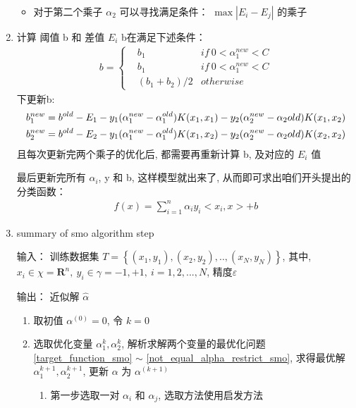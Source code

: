 \documentclass[oneside, 12pt]{ctexbook}
\begin{document}
\begin{enumerate}
\begin{itemize}
							\item 对于第二个乘子 $\alpha_2$ 可以寻找满足条件： $\max|E_i - E_j|$ 的乘子
						\end{itemize}
					
					\item 计算 阈值 b 和 差值 $E_i$
						b在满足下述条件：
							\begin{align}
								b = \left\{
									\begin{matrix}
										&b_1 &if \ 0<\alpha_1^{new}<C\\
										&b_1 &if \ 0<\alpha_1^{new}<C\\
										&(b_1 + b_2)/2 &otherwise
									\end{matrix}
								\right.
							\end{align} 
						下更新b:
							\begin{align}
							\centering
								&b_1^{new} = b^{old} - E_1 - y_1(\alpha_1^{new} - \alpha_1^{old}) K(x_1, x_1) - y_2(\alpha_2^{new} - \alpha_2{old}) K(x_1, x_2) \\
								&b_2^{new} = b^{old} - E_2 - y_1(\alpha_1^{new} - \alpha_1^{old}) K(x_1, x_2) - y_2(\alpha_2^{new} - \alpha_2{old}) K(x_2, x_2)
							\end{align}	
						且每次更新完两个乘子的优化后, 都需要再重新计算 b, 及对应的 $E_i$ 值
						
						最后更新完所有 $\alpha_i$, y 和 b, 这样模型就出来了, 从而即可求出咱们开头提出的分类函数：
							\begin{align}
								f(x) = \sum_{i=1}^{n} \alpha_i y_i <x_i, x> + b
							\end{align}
							
					\item summary of smo algorithm step
					
						输入： 训练数据集 $T = \left\{ (x_1,y_1), (x_2,y_2),..,(x_N,y_N)\right\}$, 其中, $x_i \in \chi = \boldsymbol{R}^n, \ y_i \in \gamma={-1,+1}, \ i=1,2,...,N$, 精度$\varepsilon$
						
						输出： 近似解 $\hat{\alpha}$
						\begin{enumerate}[(1)]
							\item 取初值 $\alpha^{(0)} = 0$, 令 $k=0$
							
							\item 选取优化变量 $\alpha_1^{k}, \alpha_2^{k}$, 解析求解两个变量的最优化问题 \ref{target_function_smo} $\sim$ \ref{not_equal_alpha_restrict_smo}, 求得最优解 $\alpha_1^{k+1}, \alpha_2^{k+1}$, 更新 $\alpha$ 为 $\alpha^{(k+1)}$
								\begin{enumerate}
									\item 第一步选取一对 $\alpha_i$ 和 $\alpha_j$, 选取方法使用启发方法
									

\end{enumerate}
\end{enumerate}
\end{enumerate}
\end{document}
